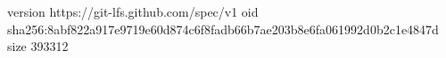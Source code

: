 version https://git-lfs.github.com/spec/v1
oid sha256:8abf822a917e9719e60d874c6f8fadb66b7ae203b8e6fa061992d0b2c1e4847d
size 393312
